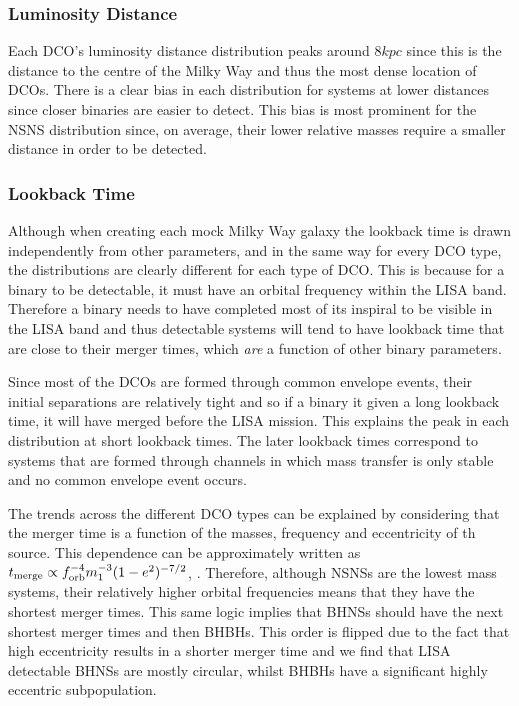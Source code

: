 \subsubsection{Luminosity Distance}
Each DCO's luminosity distance distribution peaks around $8 \unit{kpc}$ since this is the distance to the centre of the Milky Way and thus the most dense location of DCOs. There is a clear bias in each distribution for systems at lower distances since closer binaries are easier to detect. This bias is most prominent for the NSNS distribution since, on average, their lower relative masses require a smaller distance in order to be detected.

\subsubsection{Lookback Time}
Although when creating each mock Milky Way galaxy the lookback time is drawn independently from other parameters, and in the same way for every DCO type, the distributions are clearly different for each type of DCO. This is because for a binary to be detectable, it must have an orbital frequency within the LISA band. Therefore a binary needs to have completed most of its inspiral to be visible in the LISA band and thus detectable systems will tend to have lookback time that are close to their merger times, which \textit{are} a function of other binary parameters.

Since most of the DCOs are formed through common envelope events, their initial separations are relatively tight and so if a binary it given a long lookback time, it will have merged before the LISA mission. This explains the peak in each distribution at short lookback times. The later lookback times correspond to systems that are formed through channels in which mass transfer is only stable and no common envelope event occurs.

The trends across the different DCO types can be explained by considering that the merger time is a function of the masses, frequency and eccentricity of th source. This dependence can be approximately written as $t_{\rm merge} \propto f_{\rm orb}^{-4} m_1^{-3} (1 - e^2)^{-7/2}$,  \citep[][Eq.~5.14]{Peters+1964}. Therefore, although NSNSs are the lowest mass systems, their relatively higher orbital frequencies means that they have the shortest merger times. This same logic implies that BHNSs should have the next shortest merger times and then BHBHs. This order is flipped due to the fact that high eccentricity results in a shorter merger time and we find that LISA detectable BHNSs are mostly circular, whilst BHBHs have a significant highly eccentric subpopulation.

